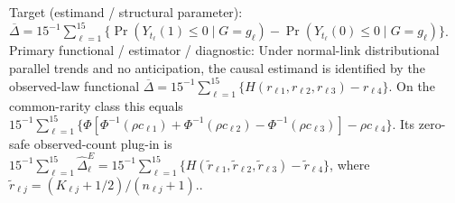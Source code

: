 \documentclass{article}
\begin{document}
Target (estimand / structural parameter): \(\overline\Delta=15^{-1}\sum_{\ell=1}^{15}\{\Pr(Y_{t_{\ell}}(1)\le0\mid G=g_{\ell})-\Pr(Y_{t_{\ell}}(0)\le0\mid G=g_{\ell})\}\).
Primary functional / estimator / diagnostic: Under normal-link distributional parallel trends and no anticipation, the causal estimand is identified by the observed-law functional \(\overline\Delta=15^{-1}\sum_{\ell=1}^{15}\{H(r_{\ell1},r_{\ell2},r_{\ell3})-r_{\ell4}\}\). On the common-rarity class this equals \(15^{-1}\sum_{\ell=1}^{15}\{\Phi[\Phi^{-1}(\rho c_{\ell1})+\Phi^{-1}(\rho c_{\ell2})-\Phi^{-1}(\rho c_{\ell3})]-\rho c_{\ell4}\}\). Its zero-safe observed-count plug-in is \(15^{-1}\sum_{\ell=1}^{15}\widehat\Delta^E_{\ell}=15^{-1}\sum_{\ell=1}^{15}\{H(\widetilde r_{\ell1},\widetilde r_{\ell2},\widetilde r_{\ell3})-\widetilde r_{\ell4}\}\), where \(\widetilde r_{\ell j}=(K_{\ell j}+1/2)/(n_{\ell j}+1)\)..
\end{document}
